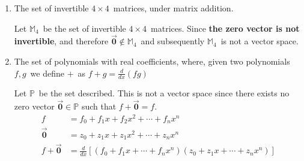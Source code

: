 \documentclass{letter}
\newcommand{\Ve}[1]{\langle #1 \rangle}
\newcommand{\Vn}[1]{\vec{\bm{#1}}}
\newcommand{\?}{\stackrel{?}{=}}
\newcommand\Que[1]{%
   \leavevmode\noindent
   #1
}
\newcommand\Ans[2][]{%
   \leavevmode\noindent
   {
       \begin{mdframed}[backgroundcolor=blue!10]
       #2
       \end{mdframed}
   }
}
\begin{document}
\begin{enumerate}
\begin{enumerate}[label=(\alph*)]
{\begin{align*}
         \shortintertext{multiplication by 1 is idempotent:}
         1C &= 1\Ve{c_{11},c_{12},\cdots,c_{33}}=\Ve{1\cdot c_{11},1\cdot c_{12},\cdots,1 \cdot c_{33}}
            = C
         \shortintertext{the set is associative of scalar multiplication:}
         z(wC) &= z(w\Ve{c_{11},c_{12},\cdots,c_{33}})=z\Ve{wc_{11},wc_{12},\cdots,wc_{33}}\\
               &= zw(\Ve{c_{11},c_{12},\cdots,c_{33}}) = (zw)C
         \shortintertext{the set is distributive of scalar over vector:}
         z(C+D) &= z(\Ve{c_{11},c_{12},\cdots,c_{33}}+\Ve{d_{11},d_{12},\cdots,d_{33}}) \\
         &= z\Ve{c_{11}+d_{11},c_{12}+d_{12},\cdots,c_{33}+d_{33}} \\
         &= \Ve{zc_{11}+zd_{11},zc_{12}+zd_{12},\cdots,zc_{33}+zd_{33}} \\
         &= \Ve{zc_{11},zc_{12},\cdots,zc_{33}} + \Ve{zd_{11},zd_{12},\cdots,zd_{33}} 
         = zC+zD
         \shortintertext{the set is distributive of vector over scalar:}
         (z+w)C &= (z+w)\Ve{c_{11},c_{12},\cdots,c_{33}} 
         = \Ve{(z+w)c_{11},(z+w)c_{12},\cdots,(z+w)c_{33}} \\ 
         &= \Ve{zc_{11}+wc_{11},zc_{12}+wc_{12},\cdots,zc_{33}+wc_{33}} \\
         &= \Ve{zc_{11},zc_{12},\cdots,zc_{33}} + \Ve{wc_{11},wc_{12},\cdots,wc_{33}} 
         = zC+wC
         \shortintertext{thus the set is a vector space.}
       \end{align*} 
    }
    \newpage
    \item \Que{
        The set of invertible $4\times 4$\ matrices, under matrix addition.    
    }
    \Ans{
        Let $\mathbb{M}_4$\ be the set of invertible $4\times 4$\ matrices. 
        Since \textbf{the zero vector is not invertible}, and therefore $\Vn{0}\not\in \mathbb{M}_4$\ and subsequently $\mathbb{M}_4$\ is not a vector space.
    }
    \item \Que{
        The set of polynomials with real coefficients, where, given two polynomials $f, g$\ we define $+$\ as $f+g=\frac{d}{dx}(fg)$       
    }
    \Ans{Let $\mathbb{P}$\ be the set described.
      This is not a vector space since there exists no zero vector $\Vn{0} \in \mathbb{P}$ such that $f + \Vn{0} = f$.
      \begin{align*}
          f &= f_0 + f_1x + f_2x^2 + \cdots + f_nx^n \\
          \Vn{0} &= z_0 + z_1x + z_1x^2 + \cdots + z_nx^n \\
          f + \Vn{0} &= \frac{d}{dx}\left[(f_0 + f_1x + \cdots + f_nx^n)(z_0+z_1x+\cdots+z_nx^n) \right] \\

\end{align*}}
\end{enumerate}
\end{enumerate}
\end{document}
